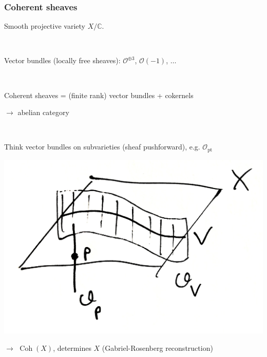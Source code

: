 \documentclass{beamer}
\DeclareMathOperator{\Coh}{Coh}
\newcommand{\C}{\mathbb{C}}
\renewcommand{\O}{\mathcal{O}}
\newcommand{\pt}{\mathrm{pt}}
\begin{document}
\begin{frame}
    \frametitle{Coherent sheaves}

    Smooth projective variety $X/\C$. \pause

    ~

    Vector bundles (locally free sheaves): $\O^{\oplus 3}$, $\O(-1)$, $\ldots$
    \pause

    ~

    Coherent sheaves = (finite rank) vector bundles + cokernels

    $\to$ abelian category \pause

    ~

    Think vector bundles on subvarieties (sheaf pushforward), e.g. $\O_\pt$

    \begin{center}
        \includegraphics[scale=0.05]{coherent_sheaves}
    \end{center} \pause

    $\to$ $\Coh(X)$, determines $X$ (Gabriel-Rosenberg reconstruction)
\end{frame}
\end{document}
